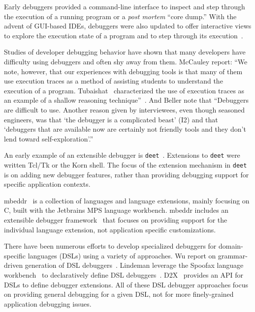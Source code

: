 \documentclass[sigplan,anonymous,review,10pt]{acmart}
\newcommand\deet{{\tt deet}\xspace}
\begin{document}
Early debuggers provided a command-line interface to inspect and step through the execution of a running program or a \emph{post mortem} ``core dump.''
With the advent of GUI-based IDEs, debuggers were also updated to offer interactive views to explore the execution state of a program and to step through its execution~\cite{Rose96a}.

Studies of developer debugging behavior have shown that many developers have difficulty using debuggers and often shy away from them.
McCauley \etal report:
``We note, however, that our experiences with debugging tools is that many of them use execution traces as a method of assisting students to understand the execution of a program. Tubaishat~\cite{Tuba01a} characterized the use of execution traces as an example of a shallow reasoning technique''~\cite{McCa08a}.
And Beller \etal note that
``Debuggers are difficult to use. Another reason given by interviewees, even though seasoned engineers, was that `the debugger is a complicated beast' (I2) and that `debuggers that are available now are certainly not friendly tools and they don't lend toward self-exploration'.''
\cite{Bell18a}

An early example of an extensible debugger is \deet~\cite{Hans97a}.
Extensions to \deet were written Tcl/Tk or the Korn shell.
The focus of the extension mechanism in \deet is on adding new debugger features, rather than providing debugging support for specific application contexts.

mbeddr~\cite{Voel17a} is a collection of languages and language extensions, mainly focusing on C, built with the Jetbrains MPS language workbench.
mbeddr includes an extensible debugger framework~\cite{Pavl15a} that focuses on providing support for the individual language extension, not application specific customizations.


There have been numerous efforts to develop specialized debuggers for domain-specific languages (DSLs) using a variety of approaches.
Wu \etal report on grammar-driven generation of DSL debuggers~\cite{HuiW08a}.
Lindeman \etal leverage the Spoofax language workbench~\cite{Kats10a} to declaratively define DSL debuggers~\cite{Lind11a}.
D2X~\cite{Brah23a} provides an API for DSLs to define debugger extensions.
All of these DSL debugger approaches focus on providing general debugging for a given DSL, not for more finely-grained application debugging issues.
\end{document}
